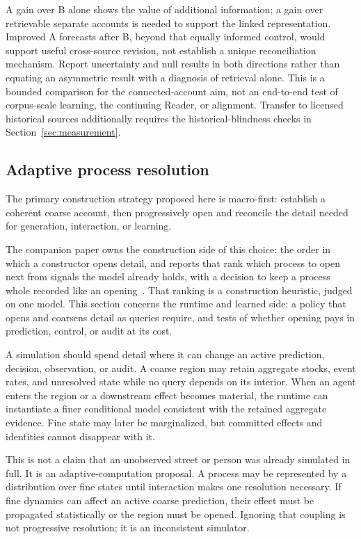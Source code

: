 \documentclass[10pt]{article}
\begin{document}
A gain over B alone shows the value of additional information; a gain over
retrievable separate accounts is needed to support the linked representation.
Improved A forecasts after B, beyond that equally informed control, would
support useful cross-source revision, not establish a unique reconciliation
mechanism. Report uncertainty and null results in both directions rather than
equating an asymmetric result with a diagnosis of retrieval alone. This is a
bounded comparison for the connected-account aim, not an end-to-end test of
corpus-scale learning, the continuing Reader, or alignment. Transfer to licensed
historical sources additionally requires the historical-blindness checks in
Section~\ref{sec:measurement}.

\subsection{Adaptive process resolution}
\label{sec:resolution}

The primary construction strategy proposed here is macro-first: establish a
coherent coarse account, then progressively open and reconcile the detail
needed for generation, interaction, or learning.

The companion paper owns the construction side of this choice: the order in
which a constructor opens detail, and reports that rank which process to open
next from signals the model already holds, with a decision to keep a process
whole recorded like an opening~\cite{westerbergMeaning2026}. That ranking is a
construction heuristic, judged on one model. This section concerns the runtime
and learned side: a policy that opens and coarsens detail as queries require,
and tests of whether opening pays in prediction, control, or audit at its cost.

A simulation should spend detail where it can change an active prediction,
decision, observation, or audit. A coarse region may retain aggregate stocks,
event rates, and unresolved state while no query depends on its interior. When
an agent enters the region or a downstream effect becomes material, the runtime
can instantiate a finer conditional model consistent with the retained
aggregate evidence. Fine state may later be marginalized, but committed effects
and identities cannot disappear with it.

This is not a claim that an unobserved street or person was already simulated
in full. It is an adaptive-computation proposal. A process may be represented
by a distribution over fine states until interaction makes one resolution
necessary. If fine dynamics can affect an active coarse prediction, their
effect must be propagated statistically or the region must be opened. Ignoring
that coupling is not progressive resolution; it is an inconsistent simulator.
\end{document}
